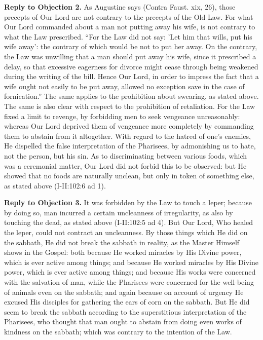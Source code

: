 \textbf{Reply to Objection 2.} As Augustine says (Contra Faust. xix, 26), those precepts of Our Lord are not contrary to the precepts of the Old Law. For what Our Lord commanded about a man not putting away his wife, is not contrary to what the Law prescribed. ``For the Law did not say: 'Let him that wills, put his wife away': the contrary of which would be not to put her away. On the contrary, the Law was unwilling that a man should put away his wife, since it prescribed a delay, so that excessive eagerness for divorce might cease through being weakened during the writing of the bill. Hence Our Lord, in order to impress the fact that a wife ought not easily to be put away, allowed no exception save in the case of fornication.'' The same applies to the prohibition about swearing, as stated above. The same is also clear with respect to the prohibition of retaliation. For the Law fixed a limit to revenge, by forbidding men to seek vengeance unreasonably: whereas Our Lord deprived them of vengeance more completely by commanding them to abstain from it altogether. With regard to the hatred of one's enemies, He dispelled the false interpretation of the Pharisees, by admonishing us to hate, not the person, but his sin. As to discriminating between various foods, which was a ceremonial matter, Our Lord did not forbid this to be observed: but He showed that no foods are naturally unclean, but only in token of something else, as stated above (I-II:102:6 ad 1).

\textbf{Reply to Objection 3.} It was forbidden by the Law to touch a leper; because by doing so, man incurred a certain uncleanness of irregularity, as also by touching the dead, as stated above (I-II:102:5 ad 4). But Our Lord, Who healed the leper, could not contract an uncleanness. By those things which He did on the sabbath, He did not break the sabbath in reality, as the Master Himself shows in the Gospel: both because He worked miracles by His Divine power, which is ever active among things; and because He worked miracles by His Divine power, which is ever active among things; and because His works were concerned with the salvation of man, while the Pharisees were concerned for the well-being of animals even on the sabbath; and again because on account of urgency He excused His disciples for gathering the ears of corn on the sabbath. But He did seem to break the sabbath according to the superstitious interpretation of the Pharisees, who thought that man ought to abstain from doing even works of kindness on the sabbath; which was contrary to the intention of the Law.

